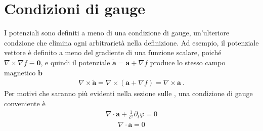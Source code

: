 \documentclass[letterpaper,10pt,english]{jupyterBook}
\begin{document}
\section{Condizioni di gauge}
\label{\detokenize{ch/potentials:condizioni-di-gauge}}
\sphinxAtStartPar
I potenziali sono definiti a meno di una condizione di gauge, un’ulteriore condzione che elimina ogni arbitrarietà nella definizione.
Ad esempio, il potenziale vettore è definito a meno del gradiente di una funzione scalare, poiché \(\nabla \times \nabla f \equiv \mathbf{0}\), e quindi il potenziale \(\tilde{\mathbf{a}} = \mathbf{a} + \nabla f\) produce lo stesso campo magnetico \(\mathbf{b}\)
\begin{equation*}
\begin{split}\nabla \times \tilde{\mathbf{a}} = \nabla \times (\mathbf{a} + \nabla f) = \nabla \times \mathbf{a} \ .\end{split}
\end{equation*}
\sphinxAtStartPar
{} Per motivi che saranno più evidenti nella sezione sulle {\hyperref[\detokenize{ch/waves:classical-electromagnetism-waves}]{}}, una condizione di gauge conveniente è
\begin{equation*}
\begin{split}\nabla \cdot \mathbf{a} + \frac{1}{c^2} \partial_t \varphi = 0\end{split}
\end{equation*}
\sphinxAtStartPar
{}
\begin{equation*}
\begin{split}\nabla \cdot \mathbf{a} = 0\end{split}
\end{equation*}
\sphinxstepscope
\end{document}
